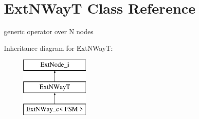 \hypertarget{classExtNWayT}{\section{Ext\-N\-Way\-T Class Reference}
\label{classExtNWayT}
}


generic operator over N nodes  


Inheritance diagram for Ext\-N\-Way\-T\-:\begin{figure}[H]
\begin{center}
\leavevmode
\includegraphics[height=3.000000cm]{classExtNWayT}
\end{center}
\end{figure}
